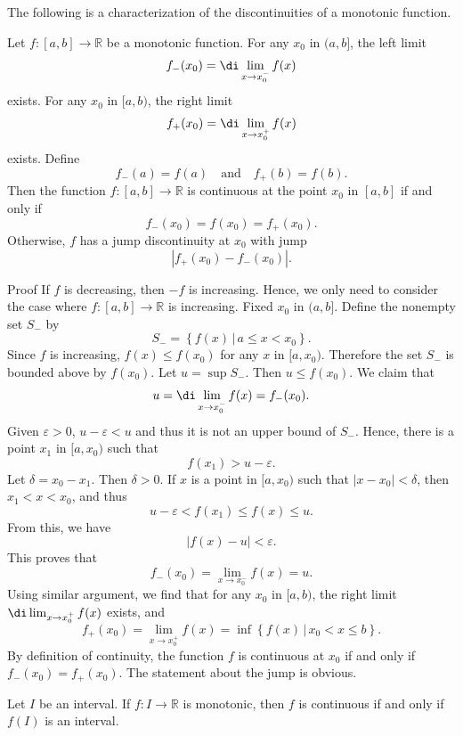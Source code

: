 \begin{example}
The following is a characterization of the discontinuities of a  monotonic function.
\begin{theorem}[label=23021103]{}
Let $f:[a,b]\rightarrow\mathbb{R}$ be a  monotonic function. For any $x_0$ in $(a, b]$, 
the left limit \[f_-(x_0)=\di \lim_{x\rightarrow x_0^-}f(x)\] exists. For any $x_0$ in $[a, b)$,    the right limit \[f_+(x_0)=\di\lim_{x\rightarrow x_0^+}f(x)\] exists. 
Define
\[f_-(a)=f(a)\quad\text{and}\quad f_+(b)=f(b).\] Then the  function $f:[a,b]\rightarrow\mathbb{R}$ is continuous at the point $x_0$ in $[a,b]$ if and only if 
\[f_-(x_0)=f(x_0)=f_+(x_0).\]
Otherwise, $f$ has a jump discontinuity at $x_0$ with jump \[|f_+(x_0)-f_-(x_0)|.\]
\end{theorem}


\begin{myproof}{Proof}
If $f$ is  decreasing, then $-f$ is  increasing. Hence, we only need to consider the case where  $f:[a,b]\rightarrow\mathbb{R}$  is  increasing.
Fixed $x_0$ in $(a, b]$. Define the nonempty set $S_-$ by
\[S_-=\left\{f(x)\,|\, a\leq x<x_0\right\}.\]
Since $f$ is  increasing,  $f(x)\leq f(x_0)$ for any $x$ in $[a, x_0)$. Therefore the set $S_-$ is bounded above by $f(x_0)$. Let $u=\sup S_-$. Then $u\leq f(x_0)$. 
We claim that
\[u=\di \lim_{x\rightarrow x_0^-}f(x)=f_-(x_0).\]
Given $\varepsilon>0$,  $u-\varepsilon <u$ and thus it is not an upper bound of $S_-$. Hence, there is a point $x_1$ in $[a, x_0)$ such that
\[f(x_1)>u- \varepsilon.\]\bp 
Let $\delta=x_0-x_1$. Then $\delta>0$. If $x$ is a point in $[a, x_0)$  such that $|x-x_0|<\delta$, then $x_1<x<x_0$, and thus
\[u-\varepsilon<f(x_1)\leq f(x)\leq u.\]From this, we have
\[|f(x)-u|<\varepsilon.\]This proves that
\[f_-(x_0)= \lim_{x\rightarrow x_0^-}f(x)=u.\]
Using similar argument, we find that for any $x_0$ in $[a, b)$, the right limit $\di\lim_{x\rightarrow x_0^+}f(x)$ exists, and
\[f_+(x_0)=\lim_{x\rightarrow x_0^+}f(x)=\inf \left\{f(x)\,|\, x_0<x\leq b\right\}.\]By definition of continuity, the function $f$ is continuous at $x_0$ if and only if $f_-(x_0)=f_+(x_0)$.
The statement about the jump is obvious.
 


\end{myproof}
 
\begin{corollary}[label=230222_1]{}
Let $I$ be an interval. If $f:I\rightarrow \mathbb{R}$ is monotonic, then $f$ is continuous if and only if $f(I)$ is an interval.
\end{corollary}



\end{example}
